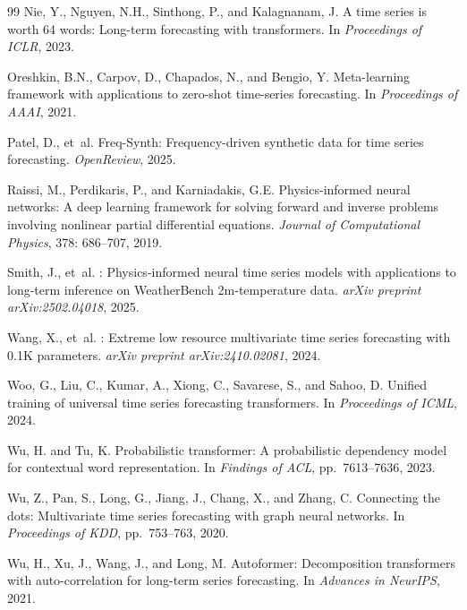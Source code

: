 \begin{thebibliography}{99}
Nie, Y., Nguyen, N.H., Sinthong, P., and Kalagnanam, J.
\newblock A time series is worth 64 words: Long-term forecasting with transformers.
\newblock In \emph{Proceedings of ICLR}, 2023.

Oreshkin, B.N., Carpov, D., Chapados, N., and Bengio, Y.
\newblock Meta-learning framework with applications to zero-shot time-series forecasting.
\newblock In \emph{Proceedings of AAAI}, 2021.

Patel, D., et~al.
\newblock Freq-Synth: Frequency-driven synthetic data for time series forecasting.
\newblock \emph{OpenReview}, 2025.

Raissi, M., Perdikaris, P., and Karniadakis, G.E.
\newblock Physics-informed neural networks: A deep learning framework for solving forward and inverse problems involving nonlinear partial differential equations.
\newblock \emph{Journal of Computational Physics}, 378: 686--707, 2019.

Smith, J., et~al.
: Physics-informed neural time series models with applications to long-term inference on {WeatherBench} 2m-temperature data.
\newblock \emph{arXiv preprint arXiv:2502.04018}, 2025.

Wang, X., et~al.
: Extreme low resource multivariate time series forecasting with 0.1{K} parameters.
\newblock \emph{arXiv preprint arXiv:2410.02081}, 2024.

Woo, G., Liu, C., Kumar, A., Xiong, C., Savarese, S., and Sahoo, D.
\newblock Unified training of universal time series forecasting transformers.
\newblock In \emph{Proceedings of ICML}, 2024.

Wu, H. and Tu, K.
\newblock Probabilistic transformer: A probabilistic dependency model for contextual word representation.
\newblock In \emph{Findings of ACL}, pp.\ 7613--7636, 2023.

Wu, Z., Pan, S., Long, G., Jiang, J., Chang, X., and Zhang, C.
\newblock Connecting the dots: Multivariate time series forecasting with graph neural networks.
\newblock In \emph{Proceedings of KDD}, pp.\ 753--763, 2020.

Wu, H., Xu, J., Wang, J., and Long, M.
\newblock Autoformer: Decomposition transformers with auto-correlation for long-term series forecasting.
\newblock In \emph{Advances in NeurIPS}, 2021.


\end{thebibliography}
